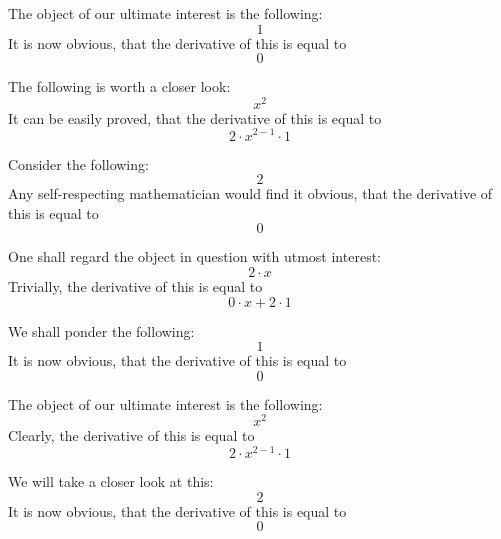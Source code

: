 \documentclass{article}
\begin{document}
The object of our ultimate interest is the following:
\begin{equation}
1 
\end{equation}
It is now obvious, that the derivative of this is equal to
\begin{equation}
0 
\end{equation}

The following is worth a closer look:
\begin{equation}
x ^{2 } 
\end{equation}
It can be easily proved, that the derivative of this is equal to
\begin{equation}
2 \cdot x ^{2 - 1 } \cdot 1 
\end{equation}

Consider the following:
\begin{equation}
2 
\end{equation}
Any self-respecting mathematician would find it obvious, that the derivative of this is equal to
\begin{equation}
0 
\end{equation}

One shall regard the object in question with utmost interest:
\begin{equation}
2 \cdot x 
\end{equation}
Trivially, the derivative of this is equal to
\begin{equation}
0 \cdot x + 2 \cdot 1 
\end{equation}

We shall ponder the following:
\begin{equation}
1 
\end{equation}
It is now obvious, that the derivative of this is equal to
\begin{equation}
0 
\end{equation}

The object of our ultimate interest is the following:
\begin{equation}
x ^{2 } 
\end{equation}
Clearly, the derivative of this is equal to
\begin{equation}
2 \cdot x ^{2 - 1 } \cdot 1 
\end{equation}

We will take a closer look at this:
\begin{equation}
2 
\end{equation}
It is now obvious, that the derivative of this is equal to
\begin{equation}
0 
\end{equation}
\end{document}
